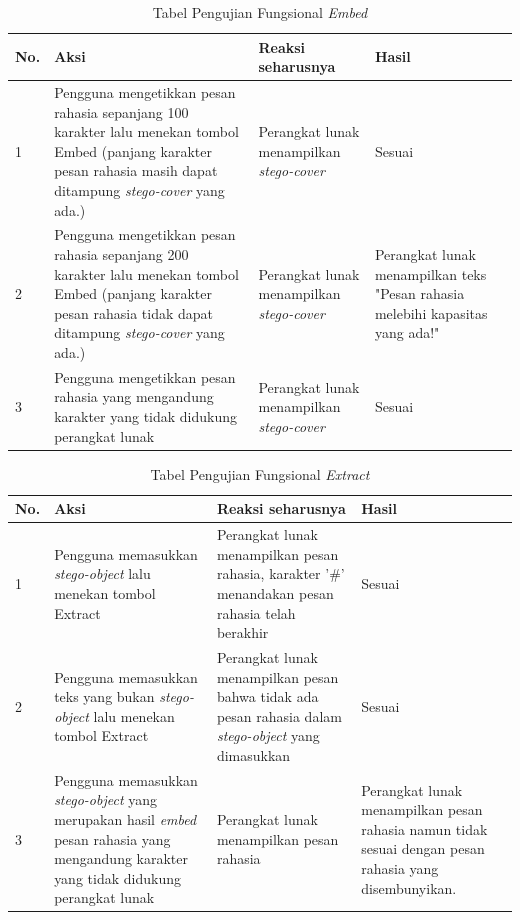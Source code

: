 \begin{table}[H]
\label{table-fungsional-embed}
\centering
\caption{Tabel Pengujian Fungsional \textit{Embed}}
\begin{tabular}{|p{0.3cm} | p{4.5cm} | p{7cm} | p{2.5cm} |}\hline
No. & Aksi & Reaksi seharusnya & Hasil\\
\hline
1 & Pengguna mengetikkan pesan rahasia sepanjang 100 karakter lalu menekan tombol Embed (panjang karakter pesan rahasia masih dapat ditampung \textit{stego-cover} yang ada.) & Perangkat lunak menampilkan \textit{stego-cover} & Sesuai\\
\hline
2 & Pengguna mengetikkan pesan rahasia sepanjang 200 karakter lalu menekan tombol Embed (panjang karakter pesan rahasia tidak dapat ditampung \textit{stego-cover} yang ada.) & Perangkat lunak menampilkan \textit{stego-cover} & Perangkat lunak menampilkan teks "Pesan rahasia melebihi kapasitas yang ada!"\\
\hline
3 & Pengguna mengetikkan pesan rahasia yang mengandung karakter yang tidak didukung perangkat lunak & Perangkat lunak menampilkan \textit{stego-cover} & Sesuai \\
\hline
\end{tabular}
\end{table}

\begin{table}[H]
\label{table-fungsional-extract}
\centering
\caption{Tabel Pengujian Fungsional \textit{Extract}}
\begin{tabular}{|p{0.3cm} | p{4.5cm} | p{7cm} | p{2.5cm} |}\hline
No. & Aksi & Reaksi seharusnya & Hasil\\
\hline
1 & Pengguna memasukkan \textit{stego-object} lalu menekan tombol Extract & Perangkat lunak menampilkan pesan rahasia, karakter '\#' menandakan pesan rahasia telah berakhir & Sesuai \\
\hline
2 & Pengguna memasukkan teks yang bukan \textit{stego-object} lalu menekan tombol Extract & Perangkat lunak menampilkan pesan bahwa tidak ada pesan rahasia dalam \textit{stego-object} yang dimasukkan & Sesuai \\
\hline
3 & Pengguna memasukkan \textit{stego-object} yang merupakan hasil \textit{embed} pesan rahasia yang mengandung karakter yang tidak didukung perangkat lunak & Perangkat lunak menampilkan pesan rahasia & Perangkat lunak menampilkan pesan rahasia namun tidak sesuai dengan pesan rahasia yang disembunyikan.\\
\hline
\end{tabular}
\end{table}

